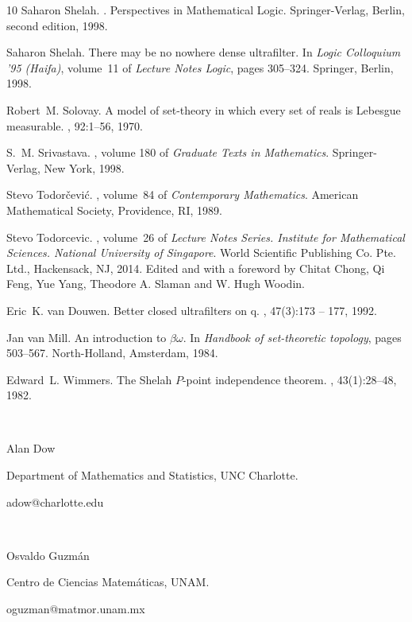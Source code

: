 \documentclass{article}%
\begin{document}
\begin{thebibliography}{10}
Saharon Shelah.
.
\newblock Perspectives in Mathematical Logic. Springer-Verlag, Berlin, second
  edition, 1998.

Saharon Shelah.
\newblock There may be no nowhere dense ultrafilter.
\newblock In {\em Logic {C}olloquium '95 ({H}aifa)}, volume~11 of {\em Lecture
  Notes Logic}, pages 305--324. Springer, Berlin, 1998.

Robert~M. Solovay.
\newblock A model of set-theory in which every set of reals is {L}ebesgue
  measurable.
, 92:1--56, 1970.

S.~M. Srivastava.
, volume 180 of {\em Graduate Texts in
  Mathematics}.
\newblock Springer-Verlag, New York, 1998.

Stevo Todor{\v{c}}evi{\'c}.
, volume~84 of {\em Contemporary
  Mathematics}.
\newblock American Mathematical Society, Providence, RI, 1989.

Stevo Todorcevic.
, volume~26 of {\em Lecture Notes
  Series. Institute for Mathematical Sciences. National University of
  Singapore}.
\newblock World Scientific Publishing Co. Pte. Ltd., Hackensack, NJ, 2014.
\newblock Edited and with a foreword by Chitat Chong, Qi Feng, Yue Yang,
  Theodore A. Slaman and W. Hugh Woodin.

Eric~K. van Douwen.
\newblock Better closed ultrafilters on q.
, 47(3):173 -- 177, 1992.

Jan van Mill.
\newblock An introduction to {$\beta\omega$}.
\newblock In {\em Handbook of set-theoretic topology}, pages 503--567.
  North-Holland, Amsterdam, 1984.

Edward~L. Wimmers.
\newblock The {S}helah {$P$}-point independence theorem.
, 43(1):28--48, 1982.

\end{thebibliography}



\qquad\qquad\qquad\ \ \ \ \ \ \ \ \ \ \ \ \ \ \ \ \ \ \ \qquad\qquad\qquad\ \ \ 

Alan Dow

Department of Mathematics and Statistics, UNC Charlotte.

adow@charlotte.edu

\qquad\qquad\qquad\ \ \ \ \ \ \ \ \ \ \ \ \qquad\ \ \ \ \ \qquad
\qquad\ \ \ \qquad\qquad\qquad\qquad\ \ \ \ \ \ 

Osvaldo Guzm\'{a}n

Centro de Ciencias Matem\'{a}ticas, UNAM.

oguzman@matmor.unam.mx
\end{document}
